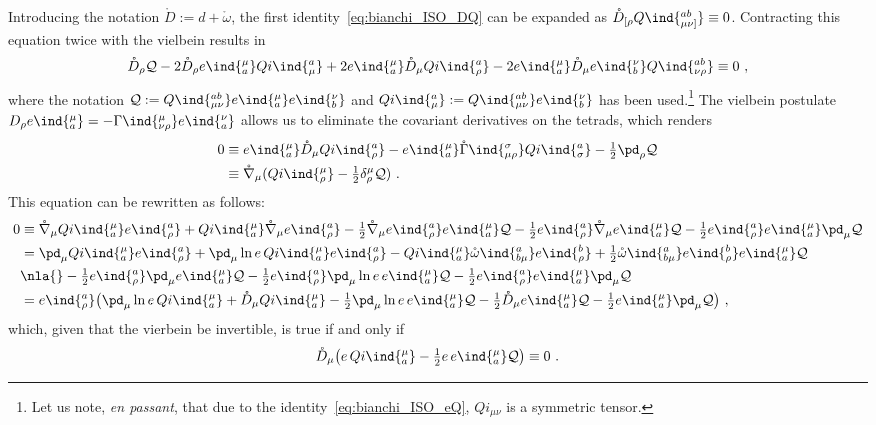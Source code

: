 \documentclass[11pt]{article}
\begin{document}
Introducing the notation $\mathring{D} := d + \mathring{\omega}$, 
the first identity~\eqref{eq:bianchi_ISO_DQ} can be expanded as 
$\mathring{D}_{[\rho} Q\ind{^{ab}_{\mu\nu]}} \equiv 0$.
Contracting this equation twice with the vielbein results in
\begin{displaymath}
	\mathring{D}_\rho \mathcal{Q} - 2 \mathring{D}_\rho 
	e\ind{_a^\mu} Qi\ind{^a_\mu} + 2 e\ind{_a^\mu} 
	\mathring{D}_\mu Qi\ind{^a_\rho} - 2 e\ind{_a^\mu} 
	\mathring{D}_\mu e\ind{_b^\nu} Q\ind{^{ab}_{\nu\rho}} \equiv 
	0~,
\end{displaymath}
where the notation $\mathcal{Q} := Q\ind{^{ab}_{\mu\nu}}
e\ind{_a^\mu} e\ind{_b^\nu}$ and $Qi\ind{^a_\mu} := 
Q\ind{^{ab}_{\mu\nu}} e\ind{_b^\nu}$ has been used.\footnote{Let 
	us note, \emph{en passant}, that due to the 
	identity~\eqref{eq:bianchi_ISO_eQ}, $Qi_{\mu \nu}$ is a
	symmetric tensor.}
The vielbein postulate $D_\rho e\ind{_a^\mu} = 
-\Gamma\ind{^\mu_{\nu\rho}} e\ind{_a^\nu}$ allows us to eliminate 
the covariant derivatives on the tetrads, which renders
\begin{align*}
	0 &\equiv
	e\ind{_a^\mu} \mathring{D}_\mu Qi\ind{^a_\rho} - e\ind{_a^\mu} 
	\mathring{\Gamma}\ind{^\sigma_{\mu \rho}} Qi\ind{^a_\sigma} - 
	\tfrac{1}{2} \pd_\rho \mathcal{Q} \\
	&\equiv \mathring{\nabla}_\mu( Qi\ind{^\mu_\rho} - 
	\tfrac{1}{2} \delta^\mu_\rho \mathcal{Q} )~.
\end{align*}
This equation can be rewritten as follows:
\begin{align*}
	0 &\equiv
	\mathring{\nabla}_\mu Qi\ind{^\mu_a} e\ind{^a_\rho} + 
	Qi\ind{^\mu_a} \mathring{\nabla}_\mu e\ind{^a_\rho} - 
	\tfrac{1}{2} \mathring{\nabla}_\mu e\ind{^a_\rho} 
	e\ind{_a^\mu} \mathcal{Q} - \tfrac{1}{2} e\ind{^a_\rho} 
	\mathring{\nabla}_\mu e\ind{_a^\mu} \mathcal{Q} - 
	\tfrac{1}{2}e\ind{^a_\rho} e\ind{_a^\mu} \pd_\mu \mathcal{Q}\\
	&= \pd_\mu Qi\ind{^\mu_a} e\ind{^a_\rho} + \pd_\mu \ln e\, 
	Qi\ind{^\mu_a} e\ind{^a_\rho} - Qi\ind{^\mu_a} 
	\mathring{\omega}\ind{^a_{b\mu}} e\ind{^b_\rho} + \tfrac{1}{2} 
	\mathring{\omega}\ind{^a_{b\mu}} e\ind{^b_\rho} e\ind{_a^\mu} 
	\mathcal{Q} \\
	&\nla{}- \tfrac{1}{2} e\ind{^a_\rho} \pd_\mu e\ind{_a^\mu} 
	\mathcal{Q} - \tfrac{1}{2} e\ind{^a_\rho} \pd_\mu \ln e\, 
	e\ind{_a^\mu} \mathcal{Q} - \tfrac{1}{2}e\ind{^a_\rho} 
	e\ind{_a^\mu} \pd_\mu \mathcal{Q} \\
	&= e\ind{^a_\rho} \big( \pd_\mu \ln e\, Qi\ind{^\mu_a} + 
	\mathring{D}_\mu Qi\ind{^\mu_a} - \tfrac{1}{2} \pd_\mu \ln e\, 
	e\ind{_a^\mu} \mathcal{Q} - \tfrac{1}{2} \mathring{D}_\mu 
	e\ind{_a^\mu} \mathcal{Q} - \tfrac{1}{2} e\ind{_a^\mu} \pd_\mu 
	\mathcal{Q} \big)~,
\end{align*}
which, given that the vierbein be invertible, is true if and only 
if
\begin{equation}
	\label{eq:contr_bianchi_DQ}
	\mathring{D}_\mu \big( e\, Qi\ind{^\mu_a} - \tfrac{1}{2} e\, 
	e\ind{_a^\mu} \mathcal{Q} \big) \equiv 0~.
\end{equation}
\end{document}
